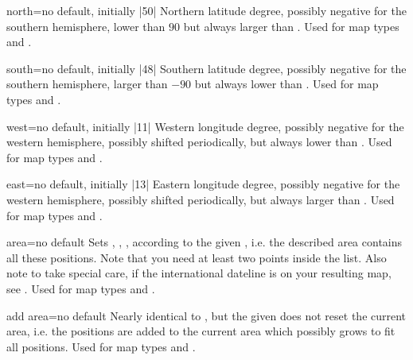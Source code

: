 \begin{docMrcKey}[supply]{north}{=}{no default, initially |50|}
  Northern latitude degree, possibly negative for the southern hemisphere,
  lower than $90$ but always larger than .
  Used for map types  and .
\end{docMrcKey}

\begin{docMrcKey}[supply]{south}{=}{no default, initially |48|}
  Southern latitude degree, possibly negative for the southern hemisphere,
  larger than $-90$ but always lower than .
  Used for map types  and .
\end{docMrcKey}

\begin{docMrcKey}[supply]{west}{=}{no default, initially |11|}
  Western longitude degree, possibly negative for the western hemisphere,
  possibly shifted periodically, but always lower than .
  Used for map types  and .
\end{docMrcKey}

\begin{docMrcKey}[supply]{east}{=}{no default, initially |13|}
  Eastern longitude degree, possibly negative for the western hemisphere,
  possibly shifted periodically, but always larger than .
  Used for map types  and .
\end{docMrcKey}


\begin{docMrcKey}[supply]{area}{=}{no default}
  Sets
  , ,
  , 
  according to the given , i.e.
  the described area contains all these positions.
  Note that you need at least two points inside the list.
  Also note to take special care, if the international dateline is on your
  resulting map, see .
  Used for map types  and .
\end{docMrcKey}


\begin{docMrcKey}[supply]{add area}{=}{no default}
  Nearly identical to , but
  the given 
  does not reset the current area, i.e. the positions are added to the
  current area which possibly grows to fit all positions.
  Used for map types  and .
\end{docMrcKey}


